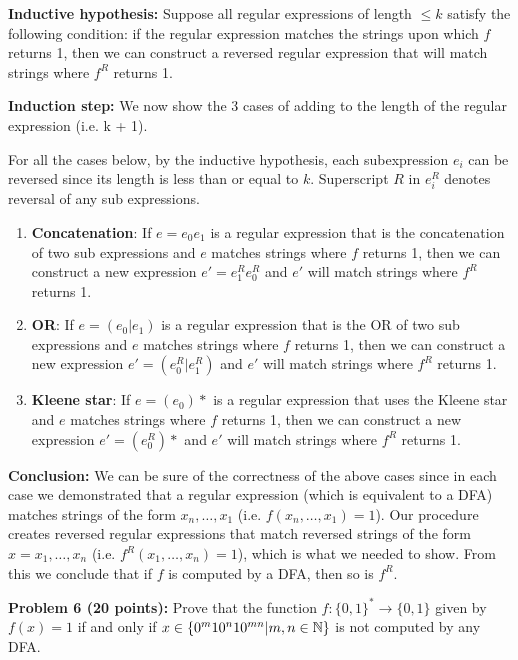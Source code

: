 \documentclass[11pt]{article}
\begin{document}
\textbf{Inductive hypothesis:} Suppose all regular expressions of length $\leq k$ satisfy the following condition: if the regular expression matches the strings upon which $f$ returns 1, then we can construct a reversed regular expression that will match strings where $f^R$ returns 1. 

\textbf{Induction step:} We now show the 3 cases of adding to the length of the regular expression (i.e. k + 1).

For all the cases below, by the inductive hypothesis, each subexpression $e_i$ can be reversed since its length is less than or equal to $k$. Superscript $R$ in $e_i^R$ denotes reversal of any sub expressions.

\begin{enumerate}
	\item \textbf{Concatenation}: If $e = e_0e_1$ is a regular expression that is the concatenation of two sub expressions and $e$ matches strings where $f$ returns 1, then we can construct a new expression $e' = e_1^Re_0^R$ and $e'$ will match strings where $f^R$ returns 1.
	\item \textbf{OR}: If $e = (e_0 | e_1)$ is a regular expression that is the OR of two sub expressions and $e$ matches strings where $f$ returns 1, then we can construct a new expression $e' = (e_0^R | e_1^R)$ and $e'$ will match strings where $f^R$ returns 1.
	\item \textbf{Kleene star}: If $e = (e_0)*$ is a regular expression that uses the Kleene star and $e$ matches strings where $f$ returns 1, then we can construct a new expression $e' = (e_0^R)*$ and $e'$ will match strings where $f^R$ returns 1.
  \end{enumerate}


\textbf{Conclusion:} We can be sure of the correctness of the above cases since in each case we demonstrated that a regular expression (which is equivalent to a DFA) matches strings of the form $x_n,\ldots,x_1$ (i.e. $f(x_n,\ldots,x_1) = 1$). Our procedure creates reversed regular expressions that match reversed strings of the form $x = x_1,\ldots,x_n$ (i.e. $f^R(x_1,\ldots,x_n) = 1$), which is what we needed to show. From this we conclude that if $f$ is computed by a DFA, then so is $f^R$. 

\newpage

\textbf{Problem 6 (20 points):} Prove that the function $f:\{0,1\}^* \to \{0,1\}$ given by $f(x) = 1$ if and only if $x \in \{0^m 1 0^n 1 0^{mn} | m,n \in \mathbb{N}\}$ is not computed by any DFA.
\end{document}
